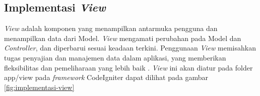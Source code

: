 
\subsection{Implementasi \textit{View}}
\textit{View }adalah komponen yang menampilkan antarmuka pengguna dan menampilkan data dari Model. \textit{View} mengamati perubahan pada Model dan \textit{Controller}, dan diperbarui sesuai keadaan terkini. Penggunaan \textit{View} memisahkan tugas penyajian dan manajemen data dalam aplikasi, yang memberikan fleksibilitas dan pemeliharaan yang lebih baik \cite{firdaus2020rancang}. \textit{View} ini akan diatur pada folder app/view pada \textit{framework} CodeIgniter dapat dilihat pada gambar \ref{fig:implementasi-view}

